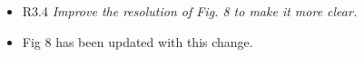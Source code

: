 \documentclass{scrartcl}
\begin{document}
\begin{itemize}
  \item R3.4 \textit{Improve the resolution of Fig. 8 to make it more clear.}
  \item[] Fig 8 has been updated with this change. 
\end{itemize}



\end{document}
